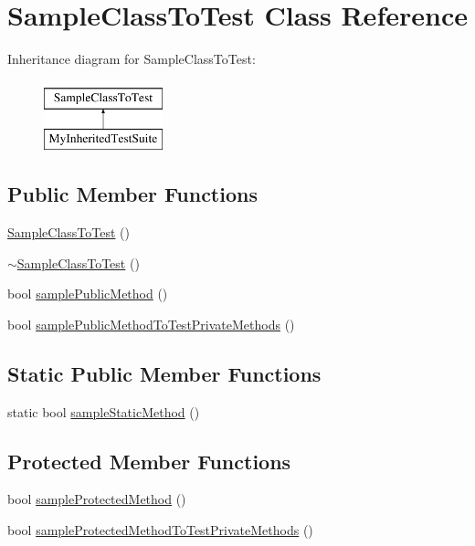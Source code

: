 \hypertarget{class_sample_class_to_test}{}\section{Sample\+Class\+To\+Test Class Reference}
\label{class_sample_class_to_test}
Inheritance diagram for Sample\+Class\+To\+Test\+:\begin{figure}[H]
\begin{center}
\leavevmode
\includegraphics[height=2.000000cm]{class_sample_class_to_test}
\end{center}
\end{figure}
\subsection*{Public Member Functions}
\begin{DoxyCompactItemize}
\item 
\mbox{\hyperlink{class_sample_class_to_test_ab3aa0ae3270fcfbe452c8584533dadb3}{Sample\+Class\+To\+Test}} ()
\item 
\mbox{\hyperlink{class_sample_class_to_test_ab1e66b62ca5dc130dbd50ea3d9aea373}{$\sim$\+Sample\+Class\+To\+Test}} ()
\item 
bool \mbox{\hyperlink{class_sample_class_to_test_a0cb90e0d767aa37ce85fe9042c5a1ad1}{sample\+Public\+Method}} ()
\item 
bool \mbox{\hyperlink{class_sample_class_to_test_a0d019a65a59ccaddca38a1c20036929d}{sample\+Public\+Method\+To\+Test\+Private\+Methods}} ()
\end{DoxyCompactItemize}
\subsection*{Static Public Member Functions}
\begin{DoxyCompactItemize}
\item 
static bool \mbox{\hyperlink{class_sample_class_to_test_a7dcee5d64f6d25294e17e68939a039d4}{sample\+Static\+Method}} ()
\end{DoxyCompactItemize}
\subsection*{Protected Member Functions}
\begin{DoxyCompactItemize}
\item 
bool \mbox{\hyperlink{class_sample_class_to_test_aabb7ee2f669ca4fa7e89b62267742b81}{sample\+Protected\+Method}} ()
\item 
bool \mbox{\hyperlink{class_sample_class_to_test_a84a45488260409b10a2fc95cf0f079b8}{sample\+Protected\+Method\+To\+Test\+Private\+Methods}} ()
\end{DoxyCompactItemize}


